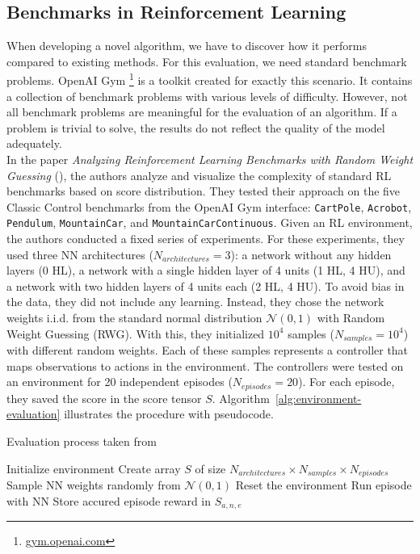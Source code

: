\subsection{Benchmarks in Reinforcement Learning}
When developing a novel algorithm, we have to discover how it performs compared to existing methods.
For this evaluation, we need standard benchmark problems. OpenAI Gym \footnote{\url{gym.openai.com}} is a toolkit created for exactly this scenario. It contains a collection of benchmark problems with various levels of difficulty. However, not all benchmark problems are meaningful for the evaluation of an algorithm. If a problem is trivial to solve, the results do not reflect the quality of the model adequately. \\
In the paper \emph{Analyzing Reinforcement Learning Benchmarks with Random Weight Guessing} (\citet{oller_analyzing_2020}), the authors analyze and visualize the complexity of standard RL benchmarks based on score distribution. They tested their approach on the five Classic Control benchmarks from the OpenAI Gym interface: \verb|CartPole|, \verb|Acrobot|, \verb|Pendulum|, \verb|MountainCar|, and \verb|MountainCarContinuous|.
Given an RL environment, the authors conducted a fixed series of experiments. For these experiments, they used three NN architectures ($N_{architectures}=3$): a network without any hidden layers (0 HL), a network with a single hidden layer of 4 units (1 HL, 4 HU), and a network with two hidden layers of 4 units each (2 HL, 4 HU).
To avoid bias in the data, they did not include any learning. Instead, they chose the network weights i.i.d. from the standard normal distribution $\mathcal{N}(0,1)$ with Random Weight Guessing (RWG). With this, they initialized $10^4$ samples ($N_{samples}=10^4$) with different random weights. Each of these samples represents a controller that maps observations to actions in the environment. The controllers were tested on an environment for 20 independent episodes ($N_{episodes}=20$). For each episode, they saved the score in the score tensor $S$. Algorithm~\ref{alg:environment-evaluation} illustrates the procedure with pseudocode.

\begin{algorithm}
\caption{Evaluation process taken from \citet{oller_analyzing_2020}}
\begin{algorithmic}[1]
\State Initialize environment
\State Create array $S$ of size $N_{architectures} \times N_{samples} \times N_{episodes}$
    \State Sample NN weights randomly from $\mathcal{N}(0,1)$
      \State Reset the environment
      \State Run episode with NN
      \State Store accured episode reward in $S_{a,n,e}$
    \EndFor
\EndFor
\end{algorithmic}
\label{alg:environment-evaluation}
\end{algorithm}

